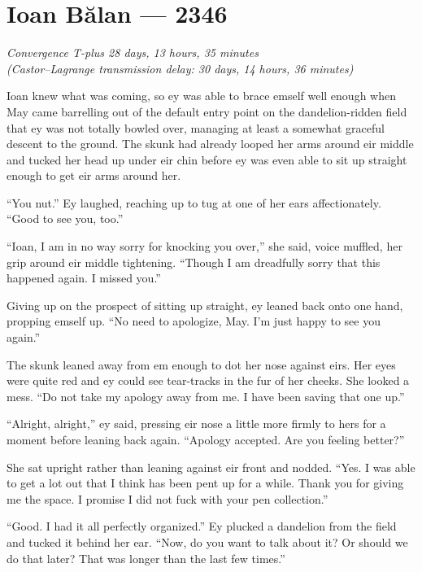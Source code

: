 \hypertarget{ioan-bux103lan-2346}{%
\chapter{Ioan Bălan — 2346}}

\begin{center}
\emph{Convergence T-plus 28 days, 13 hours, 35 minutes}\\
\emph{(Castor--Lagrange transmission delay: 30 days, 14 hours, 36 minutes)}
\end{center}

\noindent Ioan knew what was coming, so ey was able to brace emself well enough when May came barrelling out of the default entry point on the dandelion-ridden field that ey was not totally bowled over, managing at least a somewhat graceful descent to the ground. The skunk had already looped her arms around eir middle and tucked her head up under eir chin before ey was even able to sit up straight enough to get eir arms around her.

``You nut.'' Ey laughed, reaching up to tug at one of her ears affectionately. ``Good to see you, too.''

``Ioan, I am in no way sorry for knocking you over,'' she said, voice muffled, her grip around eir middle tightening. ``Though I am dreadfully sorry that this happened again. I missed you.''

Giving up on the prospect of sitting up straight, ey leaned back onto one hand, propping emself up. ``No need to apologize, May. I'm just happy to see you again.''

The skunk leaned away from em enough to dot her nose against eirs. Her eyes were quite red and ey could see tear-tracks in the fur of her cheeks. She looked a mess. ``Do not take my apology away from me. I have been saving that one up.''

``Alright, alright,'' ey said, pressing eir nose a little more firmly to hers for a moment before leaning back again. ``Apology accepted. Are you feeling better?''

She sat upright rather than leaning against eir front and nodded. ``Yes. I was able to get a lot out that I think has been pent up for a while. Thank you for giving me the space. I promise I did not fuck with your pen collection.''

``Good. I had it all perfectly organized.'' Ey plucked a dandelion from the field and tucked it behind her ear. ``Now, do you want to talk about it? Or should we do that later? That was longer than the last few times.''

